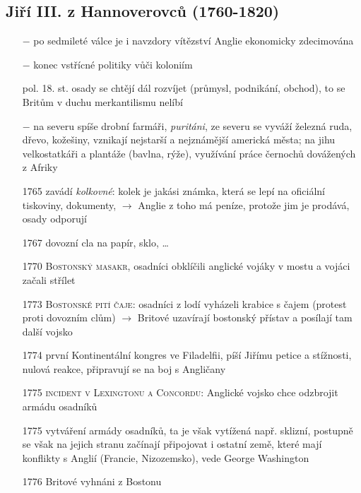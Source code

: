 \documentclass{article}
\begin{document}
\subsection*{Jiří III. z Hannoverovců (1760-1820)}
\begin{itemize}
    \vspace{-0.5em}
    \setlength\itemsep{0.15em}
    \item[$-$] po sedmileté válce je i navzdory vítězství Anglie ekonomicky zdecimována
    \item[$-$] konec vstřícné politiky vůči koloniím
    \item[pol. 18. st.] osady se chtějí dál rozvíjet (průmysl, podnikání, obchod), to se Britům v duchu merkantilismu nelíbí
    \item[$-$]  na severu spíše drobní farmáři, \textit{puritáni}, ze severu se vyváží železná ruda, dřevo, kožešiny, vznikají nejstarší a nejznámější americká města; na jihu velkostatkáři a plantáže (bavlna, rýže), využívání práce černochů dovážených z Afriky
    \item[1765] zavádí \textit{kolkovné}: kolek je jakási známka, která se lepí na oficiální tiskoviny, dokumenty, $\rightarrow$ Anglie z toho má peníze, protože jim je prodává, osady odporují
    \item[1767] dovozní cla na papír, sklo, \dots
    \item[1770] \textsc{Bostonský masakr}, osadníci obklíčili anglické vojáky v mostu a vojáci začali střílet
    \item[1773] \textsc{Bostonské pití čaje}: osadníci z lodí vyházeli krabice s čajem (protest proti dovozním clům) $\rightarrow$ Britové uzavírají bostonský přístav a posílají tam další vojsko
    \item[1774] první Kontinentální kongres ve Filadelfii, píší Jiřímu petice a stížnosti, nulová reakce, připravují se na boj s Angličany
    \item[1775] \textsc{incident v Lexingtonu a Concordu}: Anglické vojsko chce odzbrojit armádu osadníků
    \item[1775] vytváření armády osadníků, ta je však vytížená např. sklizní, postupně se však na jejich stranu začínají připojovat i ostatní země, které mají konflikty s Anglií (Francie, Nizozemsko), vede George Washington
    \item[1776] Britové vyhnáni z Bostonu

  \end{itemize}
\end{document}
